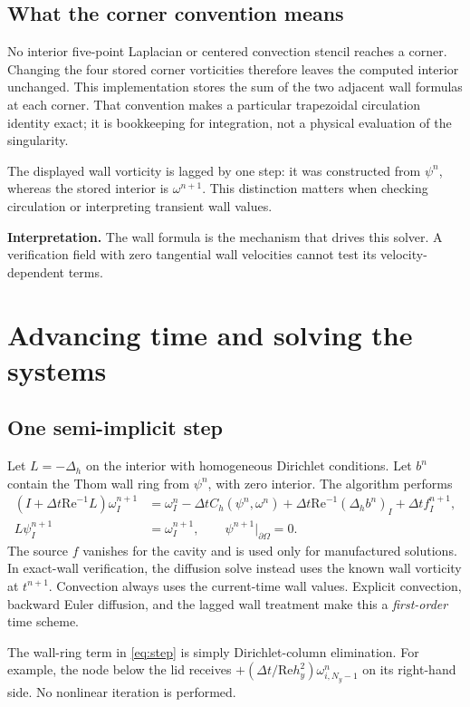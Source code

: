 \documentclass[11pt,a4paper]{article}
\newcommand{\Rey}{\mathrm{Re}}
\newcommand{\dt}{\Delta t}
\newcommand{\takeaway}[1]{\par\smallskip\noindent\colorbox{teal!7}{\parbox{\dimexpr\linewidth-2\fboxsep}{\textbf{\color{teal}Interpretation.} #1}}\par\smallskip}
\begin{document}
\subsection{What the corner convention means}
No interior five-point Laplacian or centered convection stencil reaches a
corner. Changing the four stored corner vorticities therefore leaves the
computed interior unchanged. This implementation stores the sum of the two
adjacent wall formulas at each corner. That convention makes a particular
trapezoidal circulation identity exact; it is bookkeeping for integration,
not a physical evaluation of the singularity.

The displayed wall vorticity is lagged by one step: it was constructed from
$\psi^n$, whereas the stored interior is $\omega^{n+1}$. This distinction
matters when checking circulation or interpreting transient wall values.

\takeaway{The wall formula is the mechanism that drives this solver. A
verification field with zero tangential wall velocities cannot test its
velocity-dependent terms.}

\clearpage
\section{Advancing time and solving the systems}
\subsection{One semi-implicit step}
Let $L=-\Delta_h$ on the interior with homogeneous Dirichlet conditions.
Let $b^n$ contain the Thom wall ring from $\psi^n$, with zero interior.
The algorithm performs
\begin{align}
(I+\dt\Rey^{-1}L)\omega_I^{n+1}
&=\omega_I^n-\dt C_h(\psi^n,\omega^n)
+\dt\Rey^{-1}(\Delta_h b^n)_I+\dt f_I^{n+1},\label{eq:step}\\
L\psi_I^{n+1}&=\omega_I^{n+1},\qquad \psi^{n+1}|_{\partial\Omega}=0.
\end{align}
The source $f$ vanishes for the cavity and is used only for manufactured
solutions. In exact-wall verification, the diffusion solve instead uses the
known wall vorticity at $t^{n+1}$. Convection always uses the current-time wall
values. Explicit convection, backward Euler diffusion, and the lagged wall
treatment make this a \emph{first-order} time scheme.

The wall-ring term in \eqref{eq:step} is simply Dirichlet-column elimination.
For example, the node below the lid receives
$+(\dt/\Rey h_y^2)\omega_{i,N_y-1}^{n}$ on its right-hand side.
No nonlinear iteration is performed.
\end{document}
